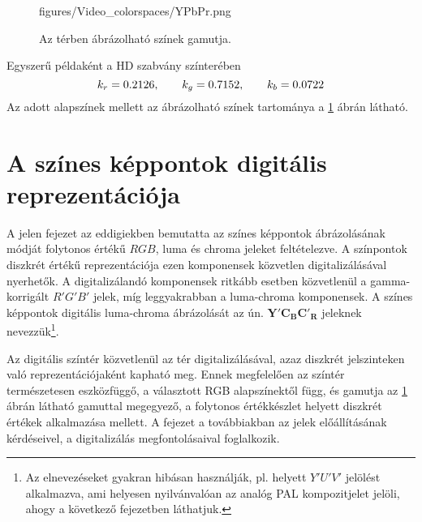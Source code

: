 \begin{figure}[]
	\centering
	\begin{minipage}[c]{0.6\textwidth}
	\begin{overpic}[width = 1\columnwidth ]{figures/Video_colorspaces/YPbPr.png}
	\end{overpic} \end{minipage}\hfill
	\begin{minipage}[c]{0.4\textwidth}
	\caption{Az \ypbpr térben ábrázolható színek gamutja.}
	\label{Fig:ypbpr_gamut}  \end{minipage}
\end{figure}
Egyszerű példaként a HD szabvány színterében 
\begin{equation}
k_r = 0.2126, \hspace{7mm}
k_g = 0.7152, \hspace{7mm}
k_b = 0.0722
\end{equation}
Az adott alapszínek mellett az ábrázolható színek tartománya a \ref{Fig:ypbpr_gamut} ábrán látható.

\section{A színes képpontok digitális reprezentációja}

A jelen fejezet az eddigiekben bemutatta az színes képpontok ábrázolásának módját folytonos értékű $RGB$, luma és chroma jeleket feltételezve.
A színpontok diszkrét értékű reprezentációja ezen komponensek közvetlen digitalizálásával nyerhetők.
A digitalizálandó komponensek ritkább esetben közvetlenül a gamma-korrigált $R'G'B'$ jelek, míg leggyakrabban a luma-chroma \ypbpr komponensek.
A színes képpontok digitális luma-chroma ábrázolását az ún. $\mathbf{Y'C_{B}C'_{R}}$ jeleknek nevezzük\footnote{Az elnevezéseket gyakran hibásan használják, pl. \ycbcr helyett $Y'U'V'$ jelölést alkalmazva, ami helyesen nyilvánvalóan az analóg PAL kompozitjelet jelöli, ahogy a következő fejezetben láthatjuk.}.

Az \ycbcr digitális színtér közvetlenül az \ypbpr tér digitalizálásával, azaz diszkrét jelszinteken való reprezentációjaként kapható meg.
Ennek megfelelően az \ycbcr színtér természetesen eszközfüggő, a választott RGB alapszínektől függ, és gamutja az \ypbpr \ref{Fig:ypbpr_gamut} ábrán látható gamuttal megegyező, a folytonos értékkészlet helyett diszkrét értékek alkalmazása mellett.
A fejezet a továbbiakban az \ycbcr jelek előállításának kérdéseivel, a digitalizálás megfontolásaival foglalkozik.

